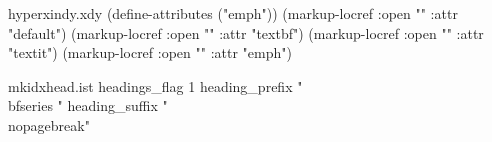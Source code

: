 \usepackage[nottoc,notlot,notlof]{tocbibind}


\begin{filecontents*}{hyperxindy.xdy}
(define-attributes ("emph"))
(markup-locref :open "" :attr "default")
(markup-locref :open "\textbf{}" :attr "textbf")
(markup-locref :open "\textit{}" :attr "textit")
(markup-locref :open "\emph{}" :attr "emph")
\end{filecontents*}

\begin{filecontents*}{mkidxhead.ist}
headings_flag 1
heading_prefix "{\\bfseries "
heading_suffix "}\\nopagebreak\n"
\end{filecontents*}

\usepackage{imakeidx} %


\makeindex[
  noautomatic,
  intoc,
  options=-s mkidxhead.ist -l -L,
]


